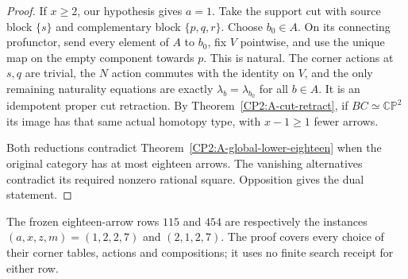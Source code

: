 \begin{proof}
If $x\geq2$, our hypothesis gives $a=1$. Take the
support cut with source block $\{s\}$ and complementary
block $\{p,q,r\}$. Choose $b_0\in A$. On its connecting
profunctor, send every element of $A$ to $b_0$, fix
$V$ pointwise, and use the unique map on the empty
component towards $p$. This is natural. The corner
actions at $s,q$ are trivial, the $N$ action commutes
with the identity on $V$, and the only remaining
naturality equations are exactly
$\lambda_b=\lambda_{b_0}$ for all $b\in A$.
It is an idempotent proper cut retraction. By
Theorem~\ref{CP2:A-cut-retract}, if $BC\simeq\mathbb{CP}^2$
its image has that same actual homotopy type, with
$x-1\geq1$ fewer arrows.

Both reductions contradict
Theorem~\ref{CP2:A-global-lower-eighteen} when the
original category has at most eighteen arrows.
The vanishing alternatives contradict its required
nonzero rational square. Opposition gives the dual
statement.
\end{proof}

\begin{remark*}
The frozen eighteen-arrow rows $115$ and $454$ are
respectively the instances
$(a,x,z,m)=(1,2,2,7)$ and $(2,1,2,7)$.
The proof covers every choice of their corner tables,
actions and compositions; it uses no finite search
receipt for either row.
\end{remark*}
